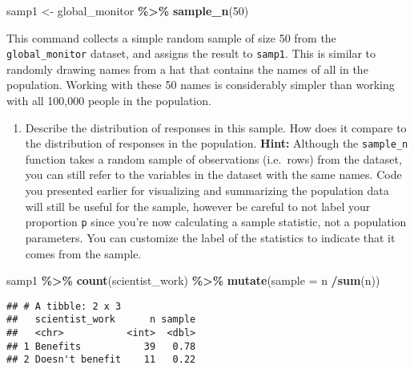 \documentclass[
]{article}
\newenvironment{Shaded}{\begin{snugshade}}{\end{snugshade}}
\newcommand{\AttributeTok}[1]{\textcolor[rgb]{0.13,0.29,0.53}{#1}}
\newcommand{\DecValTok}[1]{\textcolor[rgb]{0.00,0.00,0.81}{#1}}
\newcommand{\FunctionTok}[1]{\textcolor[rgb]{0.13,0.29,0.53}{\textbf{#1}}}
\newcommand{\NormalTok}[1]{#1}
\newcommand{\OtherTok}[1]{\textcolor[rgb]{0.56,0.35,0.01}{#1}}
\newcommand{\SpecialCharTok}[1]{\textcolor[rgb]{0.81,0.36,0.00}{\textbf{#1}}}
\providecommand{\tightlist}{%
  \setlength{\itemsep}{0pt}\setlength{\parskip}{0pt}}
\begin{document}
\begin{Shaded}
\begin{Highlighting}[]
\NormalTok{samp1 }\OtherTok{\textless{}{-}}\NormalTok{ global\_monitor }\SpecialCharTok{\%\textgreater{}\%}
  \FunctionTok{sample\_n}\NormalTok{(}\DecValTok{50}\NormalTok{)}
\end{Highlighting}
\end{Shaded}

This command collects a simple random sample of size 50 from the
\texttt{global\_monitor} dataset, and assigns the result to
\texttt{samp1}. This is similar to randomly drawing names from a hat
that contains the names of all in the population. Working with these 50
names is considerably simpler than working with all 100,000 people in
the population.

\begin{enumerate}
\def\labelenumi{\arabic{enumi}.}
\tightlist
\item
  Describe the distribution of responses in this sample. How does it
  compare to the distribution of responses in the population.
  \textbf{Hint:} Although the \texttt{sample\_n} function takes a random
  sample of observations (i.e.~rows) from the dataset, you can still
  refer to the variables in the dataset with the same names. Code you
  presented earlier for visualizing and summarizing the population data
  will still be useful for the sample, however be careful to not label
  your proportion \texttt{p} since you're now calculating a sample
  statistic, not a population parameters. You can customize the label of
  the statistics to indicate that it comes from the sample.
\end{enumerate}

\begin{Shaded}
\begin{Highlighting}[]
\NormalTok{samp1 }\SpecialCharTok{\%\textgreater{}\%}
  \FunctionTok{count}\NormalTok{(scientist\_work) }\SpecialCharTok{\%\textgreater{}\%}
  \FunctionTok{mutate}\NormalTok{(}\AttributeTok{sample =}\NormalTok{ n }\SpecialCharTok{/}\FunctionTok{sum}\NormalTok{(n))}
\end{Highlighting}
\end{Shaded}

\begin{verbatim}
## # A tibble: 2 x 3
##   scientist_work      n sample
##   <chr>           <int>  <dbl>
## 1 Benefits           39   0.78
## 2 Doesn't benefit    11   0.22
\end{verbatim}
\end{document}
